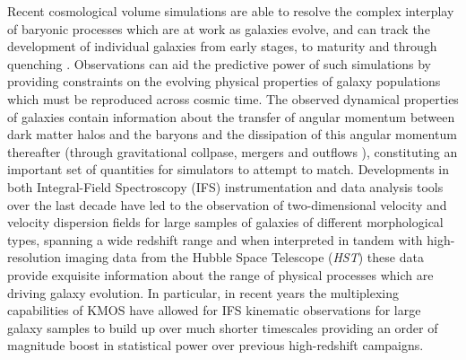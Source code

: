 \documentclass[fleqn,usenatbib]{mn2e}
\begin{document}
Recent cosmological volume simulations are able to resolve the complex interplay of baryonic processes which are at work as galaxies evolve, and can track the development of individual galaxies from early stages, to maturity and through quenching \citep{Dubois2014a,Vogelsberger2014b,Schaye2015}.
Observations can aid the predictive power of such simulations by providing constraints on the evolving physical properties of galaxy populations which must be reproduced across cosmic time.
The observed dynamical properties of galaxies contain information about the transfer of angular momentum between dark matter halos and the baryons and the dissipation of this angular momentum thereafter (through gravitational collpase, mergers and outflows \citealt{Fall1983,Romanowsky2012,Fall2013}), constituting an important set of quantities for simulators to attempt to match.
Developments in both Integral-Field Spectroscopy (IFS) instrumentation and data analysis tools over the last decade have led to the observation of two-dimensional velocity and velocity dispersion fields for large samples of galaxies of different morphological types, spanning a wide redshift range \citep[e.g.][]{Sarzi2005,Flores2006,Epinat2008,ForsterSchreiber2009,Cappellari2011,Gnerucci2011,Epinat2012,Croom2012,Swinbank2012,Swinbank2012a,Bundy2015,Wisnioski2015,Stott2016,Harrison2017,Swinbank2017} and when interpreted in tandem with high-resolution imaging data from the Hubble Space Telescope ({\em {\em HST}}) these data provide exquisite information about the range of physical processes which are driving galaxy evolution.
In particular, in recent years the multiplexing capabilities of KMOS have allowed for IFS kinematic observations for large galaxy samples to build up over much shorter timescales \citep{Sobral2013,Wisnioski2015,Stott2016,Mason2016,Harrison2017} providing an order of magnitude boost in statistical power over previous high-redshift campaigns.    
\end{document}
